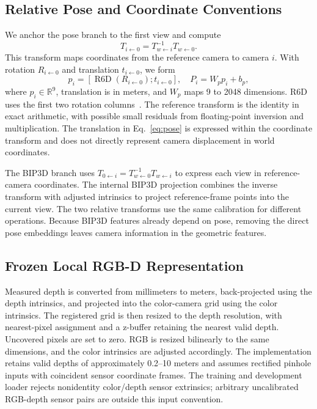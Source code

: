\subsection{Relative Pose and Coordinate Conventions}
We anchor the pose branch to the first view and compute
\begin{equation}
T_{i\leftarrow0}=T_{w\leftarrow i}^{-1}T_{w\leftarrow0}.
\label{eq:pose}
\end{equation}
This transform maps coordinates from the reference camera to camera $i$. With rotation $R_{i\leftarrow0}$ and translation $t_{i\leftarrow0}$, we form
\begin{equation}
p_i=[\operatorname{R6D}(R_{i\leftarrow0});t_{i\leftarrow0}],\quad
P_i=W_p p_i+b_p,
\end{equation}
where $p_i\in\mathbb{R}^9$, translation is in meters, and $W_p$ maps 9 to 2048 dimensions. R6D uses the first two rotation columns~\cite{rotation}. The reference transform is the identity in exact arithmetic, with possible small residuals from floating-point inversion and multiplication. The translation in Eq.~\ref{eq:pose} is expressed within the coordinate transform and does not directly represent camera displacement in world coordinates.

The BIP3D branch uses $T_{0\leftarrow i}=T_{w\leftarrow0}^{-1}T_{w\leftarrow i}$ to express each view in reference-camera coordinates. The internal BIP3D projection combines the inverse transform with adjusted intrinsics to project reference-frame points into the current view. The two relative transforms use the same calibration for different operations. Because BIP3D features already depend on pose, removing the direct pose embeddings leaves camera information in the geometric features.

\subsection{Frozen Local RGB-D Representation}
Measured depth is converted from millimeters to meters, back-projected using the depth intrinsics, and projected into the color-camera grid using the color intrinsics. The registered grid is then resized to the depth resolution, with nearest-pixel assignment and a z-buffer retaining the nearest valid depth. Uncovered pixels are set to zero. RGB is resized bilinearly to the same dimensions, and the color intrinsics are adjusted accordingly. The implementation retains valid depths of approximately 0.2--10 meters and assumes rectified pinhole inputs with coincident sensor coordinate frames. The training and development loader rejects nonidentity color/depth sensor extrinsics; arbitrary uncalibrated RGB-depth sensor pairs are outside this input convention.

